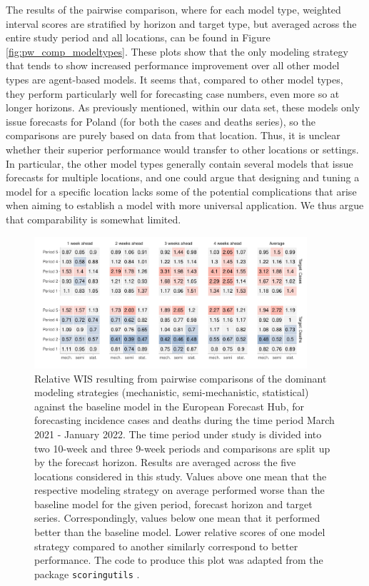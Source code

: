 The results of the pairwise comparison, where for each model type, weighted interval scores are stratified by horizon and target type, but averaged across the entire study period and all locations, can be found in Figure \ref{fig:pw_comp_modeltypes}. These plots show that the only modeling strategy that tends to show increased performance improvement over all other model types are agent-based models. It seems that, compared to other model types, they perform particularly well for forecasting case numbers, even more so at longer horizons. As previously mentioned, within our data set, these models only issue forecasts for Poland (for both the cases and deaths series), so the comparisons are purely based on data from that location. Thus, it is unclear whether their superior performance would transfer to other locations or settings. In particular, the other model types generally contain several models that issue forecasts for multiple locations, and one could argue that designing and tuning a model for a specific location lacks some of the potential complications that arise when aiming to establish a model with more universal application. We thus argue that comparability is somewhat limited.
\begin{figure}
\centering
\includegraphics[width = 0.9\textwidth]{../plots/pw_comp_model_types_across_periods_wide.pdf}
\caption{Relative WIS resulting from pairwise comparisons of the dominant modeling strategies (mechanistic, semi-mechanistic, statistical) against the baseline model in the European Forecast Hub, for forecasting incidence cases and deaths during the time period March 2021 - January 2022. The time period under study is divided into two 10-week and three 9-week periods and comparisons are split up by the forecast horizon.  Results are averaged across the five locations considered in this study. Values above one mean that the respective modeling strategy on average performed worse than the baseline model for the given period, forecast horizon and target series. Correspondingly, values below one mean that it performed better than the baseline model. Lower relative scores of one model strategy compared to another similarly correspond to better performance. The code to produce this plot was adapted from the package \texttt{scoringutils} \citep{bosse_evaluating_2022}.}
\label{fig:pw_comp_modeltypes_byperiod}
\end{figure}
